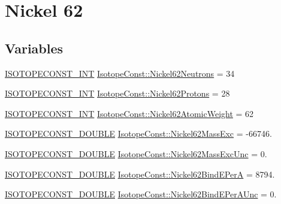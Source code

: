 \hypertarget{group___isotope_const-_nickel-_ni62}{}\section{Nickel 62}
\label{group___isotope_const-_nickel-_ni62}
\subsection*{Variables}
\begin{DoxyCompactItemize}
\item 
\mbox{\hyperlink{group___isotope_const-_macros_ga5f18360b3e99483a35c32d789e62621c}{I\+S\+O\+T\+O\+P\+E\+C\+O\+N\+S\+T\+\_\+\+I\+NT}} \mbox{\hyperlink{group___isotope_const-_nickel-_ni62_ga72645892b5eeb6092e8605f3f3054e19}{Isotope\+Const\+::\+Nickel62\+Neutrons}} = 34
\item 
\mbox{\hyperlink{group___isotope_const-_macros_ga5f18360b3e99483a35c32d789e62621c}{I\+S\+O\+T\+O\+P\+E\+C\+O\+N\+S\+T\+\_\+\+I\+NT}} \mbox{\hyperlink{group___isotope_const-_nickel-_ni62_ga9993b7e58ba166660f153c9c0e4b6e11}{Isotope\+Const\+::\+Nickel62\+Protons}} = 28
\item 
\mbox{\hyperlink{group___isotope_const-_macros_ga5f18360b3e99483a35c32d789e62621c}{I\+S\+O\+T\+O\+P\+E\+C\+O\+N\+S\+T\+\_\+\+I\+NT}} \mbox{\hyperlink{group___isotope_const-_nickel-_ni62_gaf43fb9794e2c821edb2ffc7c5a384c31}{Isotope\+Const\+::\+Nickel62\+Atomic\+Weight}} = 62
\item 
\mbox{\hyperlink{group___isotope_const-_macros_ga8f45a7272ce02c0b4c65c44636ed719a}{I\+S\+O\+T\+O\+P\+E\+C\+O\+N\+S\+T\+\_\+\+D\+O\+U\+B\+LE}} \mbox{\hyperlink{group___isotope_const-_nickel-_ni62_ga24cb31db12c25c55bfe6a8ce0e4ac840}{Isotope\+Const\+::\+Nickel62\+Mass\+Exc}} = -\/66746.
\item 
\mbox{\hyperlink{group___isotope_const-_macros_ga8f45a7272ce02c0b4c65c44636ed719a}{I\+S\+O\+T\+O\+P\+E\+C\+O\+N\+S\+T\+\_\+\+D\+O\+U\+B\+LE}} \mbox{\hyperlink{group___isotope_const-_nickel-_ni62_ga1981a5830d09d2f6ea6b8ece40324c25}{Isotope\+Const\+::\+Nickel62\+Mass\+Exc\+Unc}} = 0.
\item 
\mbox{\hyperlink{group___isotope_const-_macros_ga8f45a7272ce02c0b4c65c44636ed719a}{I\+S\+O\+T\+O\+P\+E\+C\+O\+N\+S\+T\+\_\+\+D\+O\+U\+B\+LE}} \mbox{\hyperlink{group___isotope_const-_nickel-_ni62_ga62ca9803073ca70a91dba11899b3db35}{Isotope\+Const\+::\+Nickel62\+Bind\+E\+PerA}} = 8794.
\item 
\mbox{\hyperlink{group___isotope_const-_macros_ga8f45a7272ce02c0b4c65c44636ed719a}{I\+S\+O\+T\+O\+P\+E\+C\+O\+N\+S\+T\+\_\+\+D\+O\+U\+B\+LE}} \mbox{\hyperlink{group___isotope_const-_nickel-_ni62_gaefac0a5348e9b8e2a86d61e1aca60b0c}{Isotope\+Const\+::\+Nickel62\+Bind\+E\+Per\+A\+Unc}} = 0.

\end{DoxyCompactItemize}
